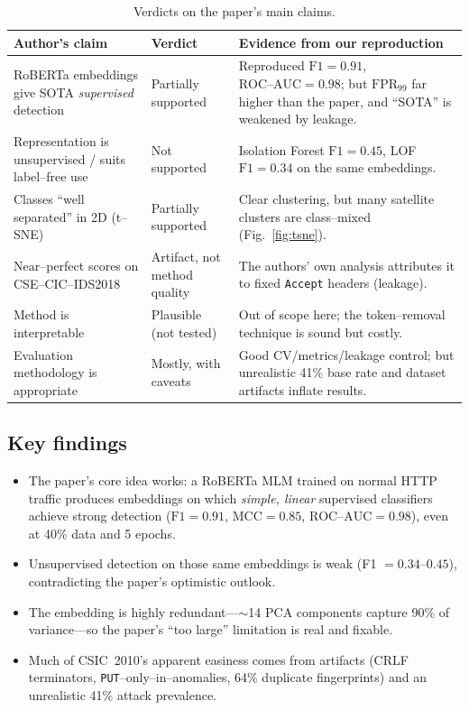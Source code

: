 \documentclass[11pt,a4paper]{article}
\begin{document}
\begin{table}[H]
  \centering
  \footnotesize
  \renewcommand{\arraystretch}{1.25}
  \begin{tabular}{p{5.4cm} p{2.7cm} p{6.6cm}}
    \toprule
    \textbf{Author's claim} & \textbf{Verdict} & \textbf{Evidence from our reproduction}\\
    \midrule
    RoBERTa embeddings give SOTA \emph{supervised} detection &
    Partially supported &
    Reproduced $\text{F1}=0.91$, $\text{ROC--AUC}=0.98$; but $\text{FPR}_{99}$ far higher
    than the paper, and ``SOTA'' is weakened by leakage.\\
    Representation is unsupervised / suits label--free use &
    Not supported &
    Isolation Forest $\text{F1}=0.45$, LOF $\text{F1}=0.34$ on the same embeddings.\\
    Classes ``well separated'' in 2D (t--SNE) &
    Partially supported &
    Clear clustering, but many satellite clusters are class--mixed (Fig.~\ref{fig:tsne}).\\
    Near--perfect scores on CSE--CIC--IDS2018 &
    Artifact, not method quality &
    The authors' own analysis attributes it to fixed \texttt{Accept} headers (leakage).\\
    Method is interpretable &
    Plausible (not tested) &
    Out of scope here; the token--removal technique is sound but costly.\\
    Evaluation methodology is appropriate &
    Mostly, with caveats &
    Good CV/metrics/leakage control; but unrealistic 41\% base rate and dataset
    artifacts inflate results.\\
    \bottomrule
  \end{tabular}
  \caption{Verdicts on the paper's main claims.}
  \label{tab:claims}
\end{table}

\subsection{Key findings}
\begin{itemize}[nosep,leftmargin=1.4em]
  \item The paper's core idea works: a RoBERTa MLM trained on normal HTTP traffic produces
        embeddings on which \emph{simple, linear} supervised classifiers achieve strong
        detection ($\text{F1}=0.91$, $\text{MCC}=0.85$, $\text{ROC--AUC}=0.98$), even at
        40\% data and 5 epochs.
  \item Unsupervised detection on those same embeddings is weak (F1 $=0.34$--$0.45$),
        contradicting the paper's optimistic outlook.
  \item The embedding is highly redundant---$\sim$14 PCA components capture 90\% of
        variance---so the paper's ``too large'' limitation is real and fixable.
  \item Much of CSIC~2010's apparent easiness comes from artifacts (CRLF terminators,
        \texttt{PUT}--only--in--anomalies, 64\% duplicate fingerprints) and an unrealistic
        41\% attack prevalence.
\end{itemize}
\end{document}
